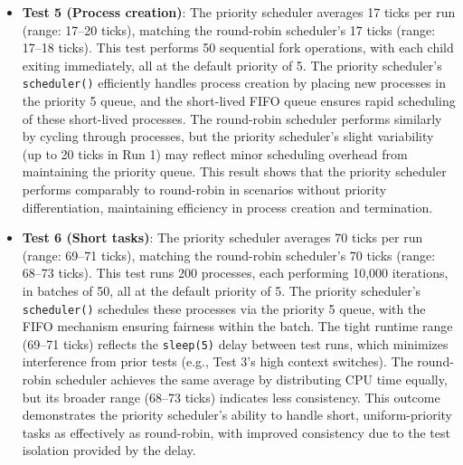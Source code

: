 \documentclass{article}
\begin{document}
\begin{itemize}
    \item \textbf{Test 5 (Process creation)}: The priority scheduler averages 17 ticks per run (range: 17–20 ticks), matching the round-robin scheduler’s 17 ticks (range: 17–18 ticks). This test performs 50 sequential fork operations, with each child exiting immediately, all at the default priority of 5. The priority scheduler’s \texttt{scheduler()} efficiently handles process creation by placing new processes in the priority 5 queue, and the short-lived FIFO queue ensures rapid scheduling of these short-lived processes. The round-robin scheduler performs similarly by cycling through processes, but the priority scheduler’s slight variability (up to 20 ticks in Run 1) may reflect minor scheduling overhead from maintaining the priority queue. This result shows that the priority scheduler performs comparably to round-robin in scenarios without priority differentiation, maintaining efficiency in process creation and termination.

    \item \textbf{Test 6 (Short tasks)}: The priority scheduler averages 70 ticks per run (range: 69–71 ticks), matching the round-robin scheduler’s 70 ticks (range: 68–73 ticks). This test runs 200 processes, each performing 10,000 iterations, in batches of 50, all at the default priority of 5. The priority scheduler’s \texttt{scheduler()} schedules these processes via the priority 5 queue, with the FIFO mechanism ensuring fairness within the batch. The tight runtime range (69–71 ticks) reflects the \texttt{sleep(5)} delay between test runs, which minimizes interference from prior tests (e.g., Test 3’s high context switches). The round-robin scheduler achieves the same average by distributing CPU time equally, but its broader range (68–73 ticks) indicates less consistency. This outcome demonstrates the priority scheduler’s ability to handle short, uniform-priority tasks as effectively as round-robin, with improved consistency due to the test isolation provided by the delay.


\end{itemize}
\end{document}

